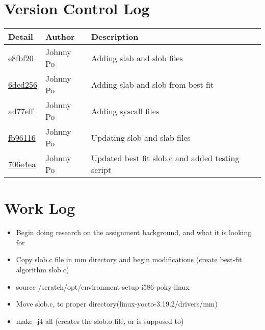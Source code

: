 \documentclass[onecolumn, draftclsnofoot,10pt, compsoc]{IEEEtran}
\begin{document}
\section{Version Control Log}
\begin{tabular}{l l l}\textbf{Detail} & \textbf{Author} & \textbf{Description}\\\hline

\href{https://github.com/jawhnypoh/Operating-Systems-II/commit/e8fbf20c5153a6da5856d5aaf66996695ce3e6c0#diff-15bd4745e12a2d3107c6423ab7df984b}{e8fbf20} & Johnny Po & Adding slab and slob files \\\hline
\href{https://github.com/jawhnypoh/Operating-Systems-II/commit/6ded256d261baa2aa2370bac5ff21e6795faf131#diff-15bd4745e12a2d3107c6423ab7df984b}{6ded256} & Johnny Po & Adding slab and slob from best fit \\\hline 
\href{https://github.com/jawhnypoh/Operating-Systems-II/commit/ad77eff948d13d24058266a4e33f3da330691db4#diff-15bd4745e12a2d3107c6423ab7df984b}{ad77eff} & Johnny Po & Adding syscall files \\\hline 
\href{https://github.com/jawhnypoh/Operating-Systems-II/commit/fb96116ab80963f1ca2cd2b64d5d3b8b5ba11648#diff-15bd4745e12a2d3107c6423ab7df984b}{fb96116} & Johnny Po & Updating slob and slab files\\\hline 
\href{https://github.com/jawhnypoh/Operating-Systems-II/commit/706e4ea960f803126e4725dcb7794d2b22273022#diff-15bd4745e12a2d3107c6423ab7df984b}{706e4ea} & Johnny Po & Updated best fit slob.c and added testing script\\\hline 




\end{tabular}

\section{Work Log}
\begin{itemize}
\item Begin doing research on the assignment background, and what it is looking for 
\item Copy slob.c file in mm directory and begin modifications (create best-fit algorithm slob.c)
\item source /scratch/opt/environment-setup-i586-poky-linux
\item Move slob.c, to proper directory(linux-yocto-3.19.2/drivers/mm) 
\item make -j4 all (creates the slob.o file, or is supposed to)
\end{itemize}


\clearpage
\end{document}
